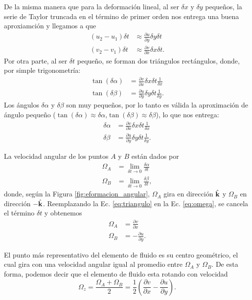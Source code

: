 De la misma manera que para la deformación lineal, al ser $\delta x$ y $\delta y$ pequeños, la serie de Taylor truncada en el término de primer orden nos entrega una buena aproxiamción y llegamos a que
%
\begin{align}
(u_2-u_1)\delta t &\approx \frac{\partial u}{\partial y} \delta y\delta t \nonumber \\
(v_2-v_1)\delta t &\approx \frac{\partial v}{\partial x} \delta x\delta t.
\end{align}
%
Por otra parte, al ser $\delta t$ pequeño, se forman dos triángulos rectángulos, donde, por simple trigonometría:
%
\begin{align}
\tan (\delta \alpha) &= \frac{\partial v}{\partial x} \delta x\delta t\frac{1}{\delta x}\nonumber \\
\tan (\delta \beta) &= \frac{\partial u}{\partial y} \delta y\delta t\frac{1}{\delta y}.
\end{align}
%
Los ángulos $\delta \alpha$ y $\delta \beta$ son muy pequeños, por lo tanto es válida la aproximación de ángulo pequeño ($\tan (\delta \alpha)\approx\delta\alpha$,$\tan (\delta \beta)\approx\delta\beta$), lo que nos entrega:
%
\begin{align}\label{eq:triangulo}
\delta \alpha &= \frac{\partial v}{\partial x} \delta x\delta t\frac{1}{\delta x}\nonumber \\
\delta\beta &= \frac{\partial u}{\partial y} \delta y\delta t\frac{1}{\delta y}.
\end{align}

La velocidad angular de los puntos $A$ y $B$ están dados por 
%
\begin{align}\label{eq:omega}
\Omega_A &= \lim_{\delta t\to 0}\frac{\delta \alpha}{\delta t} \nonumber \\
\Omega_B &= \lim_{\delta t\to 0}\frac{\delta \beta}{\delta t},
\end{align}
%
donde, según la Figura \ref{fig:eformacion_angular}, $\Omega_A$ gira en dirección $\hat{\textbf{k}}$ y $\Omega_B$ en dirección $-\hat{\textbf{k}}$.
Reemplazando la Ec. \eqref{eq:triangulo} en la Ec. \eqref{eq:omega}, se cancela el término $\delta t$ y obtenemos
%
\begin{align}
\Omega_A &= \frac{\partial v}{\partial x}\nonumber \\
\Omega_B &= -\frac{\partial u}{\partial y}.
\end{align}

El punto más representativo del elemento de fluido es su centro geométrico, el cual gira con una velocidad angular igual al promedio entre $\Omega_A$ y $\Omega_B$. 
De esta forma, podemos decir que el elemento de fluido esta rotando con velocidad 
%
\begin{equation}\label{eq:omega_z}
\Omega_z = \frac{\Omega_A+\Omega_B}{2} = \frac{1}{2}\left(\frac{\partial v}{\partial x}-\frac{\partial u}{\partial y}\right).
\end{equation}

